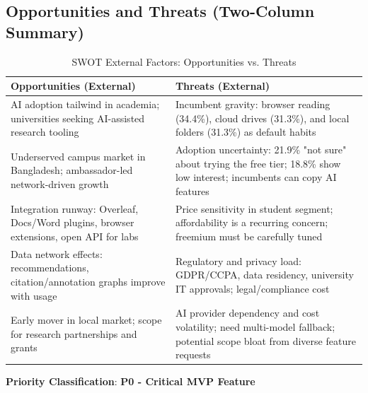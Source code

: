 \subsection{Opportunities and Threats (Two-Column Summary)}

\begin{table}[H]
    \centering
    \small
    \begin{tabularx}{\textwidth}{|>{\raggedright\arraybackslash}X|>{\raggedright\arraybackslash}X|}
        \hline
        \textbf{Opportunities (External)}                                                      & \textbf{Threats (External)}                                                                                                   \\
        \hline
        AI adoption tailwind in academia; universities seeking AI-assisted research tooling    & Incumbent gravity: browser reading (34.4\%), cloud drives (31.3\%), and local folders (31.3\%) as default habits              \\
        \hline
        Underserved campus market in Bangladesh; ambassador-led network-driven growth          & Adoption uncertainty: 21.9\% "not sure" about trying the free tier; 18.8\% show low interest; incumbents can copy AI features \\
        \hline
        Integration runway: Overleaf, Docs/Word plugins, browser extensions, open API for labs & Price sensitivity in student segment; affordability is a recurring concern; freemium must be carefully tuned                  \\
        \hline
        Data network effects: recommendations, citation/annotation graphs improve with usage   & Regulatory and privacy load: GDPR/CCPA, data residency, university IT approvals; legal/compliance cost                        \\
        \hline
        Early mover in local market; scope for research partnerships and grants                & AI provider dependency and cost volatility; need multi-model fallback; potential scope bloat from diverse feature requests    \\
        \hline
    \end{tabularx}
    \caption{SWOT External Factors: Opportunities vs. Threats}
    \label{table:swot-external}
\end{table}

\textbf{Priority Classification}: \textbf{P0 - Critical MVP Feature}

